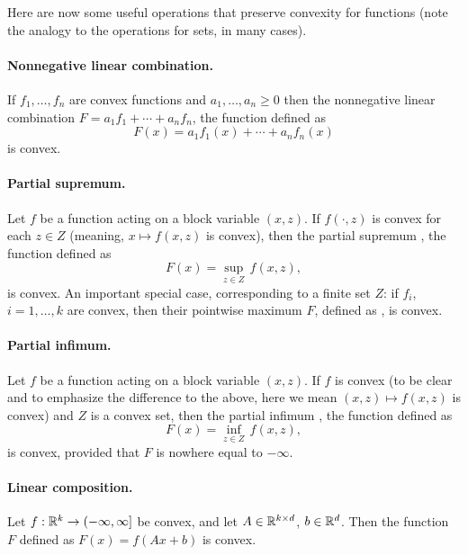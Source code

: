 \medskip

Here are now some useful operations that preserve convexity for functions (note
the analogy to the operations for sets, in many cases). 

\paragraph{Nonnegative linear combination.} 

If $f_1,\dots,f_n$ are convex functions and $a_1,\dots,a_n \geq 0$ then the
nonnegative linear combination $F = a_1f_1+\cdots+a_nf_n$, the function defined
as
\[
F(x) = a_1f_1(x) + \cdots + a_nf_n(x) 
\]
is convex.

\paragraph{Partial supremum.} 

Let $f$ be a function acting on a block variable $(x,z)$. If $f(\cdot,z)$ is
convex for each $z \in Z$ (meaning, $x \mapsto f(x,z)$ is convex), then the
partial supremum , the function
defined as  
\[
F(x) = \sup_{z \in Z} \, f(x,z),
\]
is convex. An important special case, corresponding to a finite set $Z$: if
$f_i$, $i=1,\dots,k$ are convex, then their pointwise maximum $F$, defined as
, is convex.      

\paragraph{Partial infimum.} 

Let $f$ be a function acting on a block variable $(x,z)$. If $f$ is convex (to
be clear and to emphasize the difference to the above, here we mean $(x,z)
\mapsto f(x,z)$ is convex) and $Z$ is a convex set, then the partial infimum
, the function defined as  
\[
F(x) = \inf_{z \in Z} \, f(x,z),
\]
is convex, provided that $F$ is nowhere equal to $-\infty$. 

\paragraph{Linear composition.} 

Let $f : \mathbb{R}^k \to (-\infty, \infty]$ be convex, and let $A \in \mathbb{R}^{k \times d}$,
$b \in \mathbb{R}^d$. Then the function $F$ defined as $F(x) = f(Ax+b)$ is convex.     

